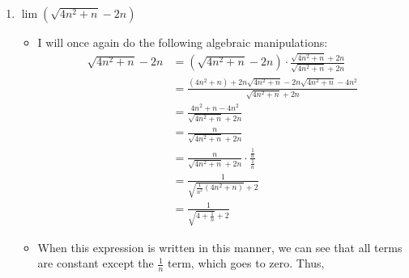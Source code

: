 \documentclass[10pt,a4paper]{article}
\theoremstyle{definition}
\begin{document}
\begin{enumerate}[label = (\alph*)]
\begin{itemize}
	\end{itemize}
\item $\lim(\sqrt{4n^2 + n} - 2n)$
	\begin{itemize}
	\item I will once again do the following algebraic manipulations:
	\begin{align*}
	\sqrt{4n^2 + n} - 2n &= \left(\sqrt{4n^2 + n} - 2n\right)\cdot \frac{\sqrt{4n^2 + n} + 2n}{\sqrt{4n^2 + n} + 2n}\\
	&= \frac{(4n^2 + n) + 2n\sqrt{4n^2 + n} - 2n\sqrt{4n^2 + n} - 4n^2}{\sqrt{4n^2 + n} + 2n}\\
	&= \frac{4n^2 + n - 4n^2}{\sqrt{4n^2 + n} + 2n}\\
	&= \frac{n}{\sqrt{4n^2 + n} + 2n}\\
	&= \frac{n}{\sqrt{4n^2 + n} + 2n} \cdot \frac{\frac{1}{n}}{\frac{1}{n}}\\
	&= \frac{1}{\sqrt{\frac{1}{n^2}(4n^2 + n)} + 2}\\
	&= \frac{1}{\sqrt{4 + \frac{1}{n}} + 2}
	\end{align*}
	\item When this expression is written in this manner, we can see that all terms are constant except the $\displaystyle \frac{1}{n}$ term, which goes to zero. Thus, 
	\end{itemize}
\end{enumerate}
\end{document}
